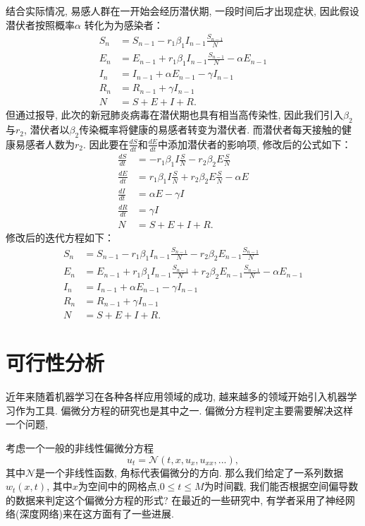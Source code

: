 \documentclass[lang=cn,11pt]{elegantpaper}
\begin{document}
结合实际情况, 易感人群在一开始会经历潜伏期, 一段时间后才出现症状, 因此假设潜伏者按照概率$\alpha$ 转化为为感染者：
\large
\begin{align*}
S_n&=S_{n-1}-r_1\beta_1 I_{n-1}\frac{S_{n-1}}{N} \\
E_n&=E_{n-1}+r_1\beta_1 I_{n-1}\frac{S_{n-1}}{N} - \alpha E_{n-1} \\ I_n&=I_{n-1}+\alpha E_{n-1}-\gamma I_{n-1}\\
R_n&=R_{n-1}+\gamma I_{n-1}\\
N&=S+E+I+R.
\end{align*}
\normalsize
但通过报导, 此次的新冠肺炎病毒在潜伏期也具有相当高传染性, 因此我们引入$\beta _2$与$r_2$, 潜伏者以$\beta_2$传染概率将健康的易感者转变为潜伏者. 而潜伏者每天接触的健康易感者人数为$r_2$. 因此要在$\frac{dS}{dt}$和$\frac{dE}{dt}$中添加潜伏者的影响项, 修改后的公式如下：
\large
\begin{align*}
\frac{dS}{d t}&=-r_1\beta_1 I\frac{S}{N}-r_2\beta _2E\frac{S}{N} \\
\frac{dE}{d t}&=r_1\beta_1 I\frac{S}{N}+r_2\beta _2E\frac{S}{N}-\alpha E\\
\frac{dI}{d t}&=\alpha E-\gamma I\\
\frac{dR}{d t}&=\gamma I\\
N&=S+E+I+R.
\end{align*}
\normalsize
修改后的迭代方程如下：
\large
\begin{align*}
S_n&=S_{n-1}-r_1\beta_1 I_{n-1}\frac{S_{n-1}}{N}-r_2\beta _2E_{n-1}\frac{S_{n-1}}{N} \\
E_n&=E_{n-1}+r_1\beta_1 I_{n-1}\frac{S_{n-1}}{N}+r_2\beta_2E_{n-1}\frac{S_{n-1}}{N}-\alpha E_{n-1} \\
I_n&=I_{n-1}+\alpha E_{n-1}-\gamma I_{n-1}\\
R_n&=R_{n-1}+\gamma I_{n-1}	\\
N&=S+E+I+R.
\end{align*}
\normalsize


\section{可行性分析}

近年来随着机器学习在各种各样应用领域的成功, 越来越多的领域开始引入机器学习作为工具. 偏微分方程的研究也是其中之一. 偏微分方程判定主要需要解决这样一个问题, 



考虑一个一般的非线性偏微分方程
\large
\begin{equation}
	u_t=\mathcal N(t,x,u_x,u_{xx},...),
\end{equation}
\normalsize
其中$\mathcal N$是一个非线性函数, 角标代表偏微分的方向. 那么我们给定了一系列数据$w_t(x,t)$, 其中$x$为空间中的网格点,$0\leq t\leq M$为时间戳, 我们能否根据空间偏导数的数据来判定这个偏微分方程的形式? 在最近的一些研究中, 有学者采用了神经网络(深度网络)来在这方面有了一些进展.
\end{document}

